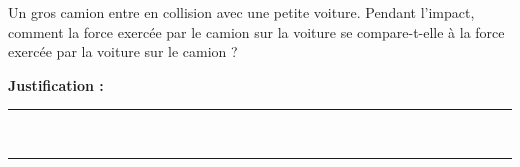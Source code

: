 Un gros camion entre en collision avec une petite voiture. Pendant l'impact, comment la force exercée par le camion sur la voiture se compare-t-elle à la force exercée par la voiture sur le camion ?

\choices

\noindent\textbf{Justification :} \hrulefill \\[2.5ex]
\rule{\linewidth}{0.4pt} \\[2.5ex]
\rule{\linewidth}{0.4pt}
\vfill
